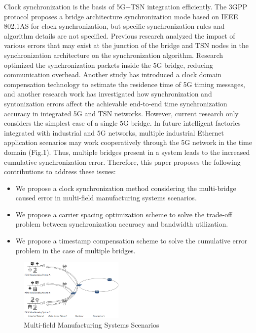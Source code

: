 \documentclass[english]{cccconf}
\begin{document}
Clock synchronization is the basis of 5G+TSN integration efficiently. The 3GPP protocol proposes a bridge architecture synchronization mode based on IEEE 802.1AS for clock synchronization, but specific synchronization rules and algorithm details are not specified\cite{888888}. Previous research analyzed the impact of various errors that may exist at the junction of the bridge and TSN nodes in the synchronization architecture on the synchronization algorithm\cite{9527833}. Research\cite{9211936} optimized the synchronization packets inside the 5G bridge, reducing communication overhead. Another study has introduced a clock domain compensation technology to estimate the residence time of 5G timing messages\cite{9674640}, and another research work has investigated how synchronization and syntonization errors affect the achievable end-to-end time synchronization accuracy in integrated 5G and TSN networks. However, current research only considers the simplest case of a single 5G bridge\cite{9557468}. In future intelligent factories integrated with industrial and 5G networks, multiple industrial Ethernet application scenarios may work cooperatively through the 5G network in the time domain\cite{8402373} (Fig.1). Thus, multiple bridges present in a system leads to the increased cumulative synchronization error. Therefore, this paper proposes the following contributions to address these issues:
\begin{itemize}
	\item We propose a clock synchronization method considering the multi-bridge caused error in multi-field manufacturing systems scenarios.
	\item We propose a carrier spacing optimization scheme to solve the trade-off problem between synchronization accuracy and bandwidth utilization.
	\item We propose a timestamp compensation scheme to solve the cumulative error problem in the case of multiple bridges.

\end{itemize}
\begin{figure}[htbp]
	\centering
	\setcounter{figure}{0}
	\includegraphics[width=2in]{fig11.png}
	\caption{Multi-field Manufacturing Systems Scenarios}
\end{figure}
\end{document}
